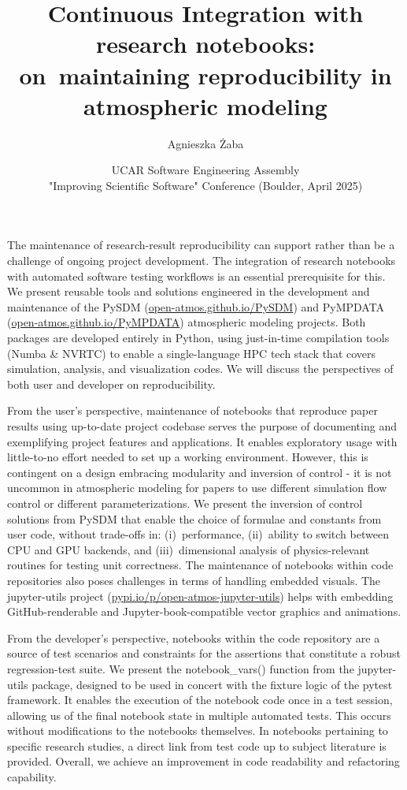 \documentclass[12pt]{article}
\title{Continuous Integration with research notebooks:\\ on~maintaining reproducibility in atmospheric modeling
}
\author{Agnieszka Żaba}
\date{UCAR Software Engineering Assembly\\ "Improving Scientific Software" Conference (Boulder, April 2025)}
\begin{document}
\maketitle
\thispagestyle{empty}
The maintenance of research-result reproducibility can support rather than be a challenge of ongoing project development.
The integration of research notebooks with automated software testing workflows is an essential prerequisite for this. 
We present reusable tools and solutions engineered in the development and maintenance of the PySDM (\href{https://open-atmos.github.io/PySDM}{open-atmos.github.io/PySDM}) and PyMPDATA (\href{open-atmos.github.io/PyMPDATA}{open-atmos.github.io/PyMPDATA}) atmospheric modeling projects.
Both packages are developed entirely in Python, using just-in-time compilation tools (Numba \& NVRTC) to enable a single-language HPC tech stack that covers simulation, analysis, and visualization codes.
We will discuss the perspectives of both user and developer on reproducibility.

From the user's perspective, maintenance of notebooks that reproduce paper results using up-to-date project codebase serves the purpose of documenting and exemplifying project features and applications. 
It enables exploratory usage with little-to-no effort needed to set up a working environment.
However, this is contingent on a design embracing modularity and inversion of control - it is not uncommon in atmospheric modeling for papers to use different simulation flow control or different parameterizations.
We present the inversion of control solutions from PySDM that enable the choice of formulae and constants from user code, without trade-offs in: (i)~performance, (ii)~ability to switch between CPU and GPU backends, and (iii)~dimensional analysis of physics-relevant routines for testing unit correctness.
The maintenance of notebooks within code repositories also poses challenges in terms of handling embedded visuals.
The jupyter-utils project (\href{https://pypi.io/p/open-atmos-jupyter-utils}{pypi.io/p/open-atmos-jupyter-utils}) helps with embedding GitHub-renderable and Jupyter-book-compatible vector graphics and animations. 




From the developer's perspective, notebooks within the code repository are a source of test scenarios and constraints for the assertions that constitute a robust regression-test suite.
We present the notebook\_vars() function from the jupyter-utils package, designed to be used in concert with the fixture logic of the pytest framework.
It enables the execution of the notebook code once in a test session, allowing us of  the final notebook state in multiple automated tests. This occurs without modifications to the notebooks themselves.
In notebooks pertaining to specific research studies, a direct link from test code up to subject literature is provided.
Overall, we achieve an improvement in code readability and refactoring capability.
\end{document}
